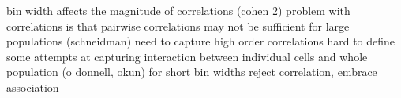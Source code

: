 bin width affects the magnitude of correlations (cohen 2)
problem with correlations is that pairwise correlations may not be sufficient for large populations (schneidman)
need to capture high order correlations
hard to define
some attempts at capturing interaction between individual cells and whole population (o donnell, okun)
for short bin widths reject correlation, embrace association
